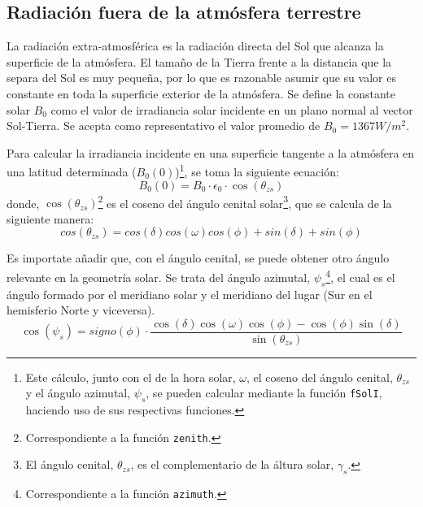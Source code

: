 \subsection{Radiación fuera de la atmósfera terrestre}
\label{sec:org3fc6bdd}
La radiación extra-atmosférica es la radiación directa del Sol que alcanza la superficie de la atmósfera. El tamaño de la Tierra frente a la distancia que la separa del Sol es muy pequeña, por lo que es razonable asumir que su valor es constante en toda la superficie exterior de la atmósfera. Se define la constante solar \(B_0\) como el valor de irradiancia solar incidente en un plano normal al vector Sol-Tierra. Se acepta como representativo el valor promedio de \(B_0=1367W/m^2\).

Para calcular la irradiancia incidente en una superficie tangente a la atmósfera en una latitud determinada (\(B_0(0)\))\footnote{Este cálculo, junto con el de la hora solar, \(\omega\), el coseno del ángulo cenital, \(\theta_{zs}\) y  el ángulo azimutal, \(\psi_s\), se pueden calcular mediante la función \texttt{fSolI}, haciendo uso de sus respectivas funciones.}, se toma la siguiente ecuación: 
\begin{equation}
B_0(0)=B_0 \cdot \epsilon_0 \cdot \cos(\theta_{zs})
\label{eq:irradianciaextra}
\end{equation}
donde, \(\cos(\theta_{zs})\)\footnote{Correspondiente a la función \texttt{zenith}.} es el coseno del ángulo cenital solar\footnote{El ángulo cenital, \(\theta_{zs}\), es el complementario de la áltura solar, \(\gamma_s\).}, que se calcula de la siguiente manera:
\begin{equation}
cos(\theta_{zs})=cos(\delta)cos(\omega)cos(\phi)+sin(\delta)+sin(\phi)
\end{equation}

Es importate añadir que, con el ángulo cenital, se puede obtener otro ángulo relevante en la geometría solar. Se trata del ángulo azimutal, \(\psi_s\)\footnote{Correspondiente a la función \texttt{azimuth}.}, el cual es el ángulo formado por el meridiano solar y el meridiano del lugar (Sur en el hemisferio Norte y viceversa). 
\begin{equation}
\cos(\psi_s)=signo(\phi)\cdot \frac{\cos(\delta)\cos(\omega)\cos(\phi)-\cos(\phi)\sin(\delta)}{\sin(\theta_{zs})}
\end{equation}

